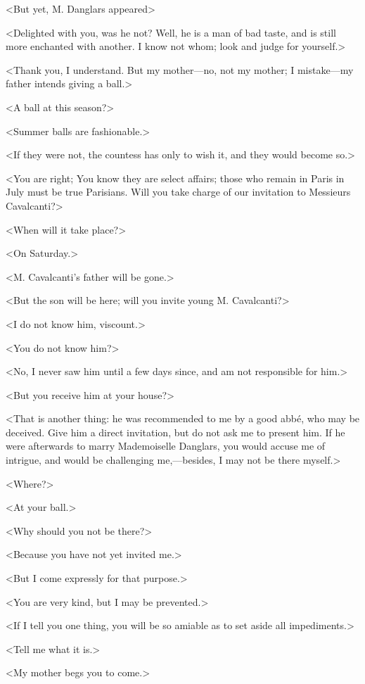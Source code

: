  <But yet, M. Danglars appeared\longdash> 

 <Delighted with you, was he not? Well, he is a man of bad taste, and is still more enchanted with another. I know not whom; look and judge for yourself.> 

 <Thank you, I understand. But my mother—no, not my mother; I mistake—my father intends giving a ball.> 

 <A ball at this season?> 

 <Summer balls are fashionable.> 

 <If they were not, the countess has only to wish it, and they would become so.> 

 <You are right; You know they are select affairs; those who remain in Paris in July must be true Parisians. Will you take charge of our invitation to Messieurs Cavalcanti?> 

 <When will it take place?> 

 <On Saturday.> 

 <M. Cavalcanti's father will be gone.> 

 <But the son will be here; will you invite young M. Cavalcanti?> 

 <I do not know him, viscount.> 

 <You do not know him?> 

 <No, I never saw him until a few days since, and am not responsible for him.> 

 <But you receive him at your house?> 

 <That is another thing: he was recommended to me by a good abbé, who may be deceived. Give him a direct invitation, but do not ask me to present him. If he were afterwards to marry Mademoiselle Danglars, you would accuse me of intrigue, and would be challenging me,—besides, I may not be there myself.> 

 <Where?> 

 <At your ball.> 

 <Why should you not be there?> 

 <Because you have not yet invited me.> 

 <But I come expressly for that purpose.> 

 <You are very kind, but I may be prevented.> 

 <If I tell you one thing, you will be so amiable as to set aside all impediments.> 

 <Tell me what it is.> 

 <My mother begs you to come.> 

